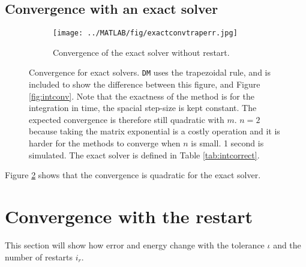 \subsection{Convergence with an exact solver} %
\label{sec:exactconv}
\begin{figure}[H]
        \centering
        \begin{subfigure}[b]{0.3\textwidth}
                \texttt{[image: ../MATLAB/fig/exactconvtraperr.jpg]}
                \caption{ Convergence of the exact solver without restart. }
                \label{fig:exactconvtraperr}
        \end{subfigure}
       
\caption{Convergence for exact solvers. \texttt{DM} uses the trapezoidal rule, and is included to show the difference between this figure, and Figure \ref{fig:intconv}. Note that the exactness of the method is for the integration in time, the spacial step-size is kept constant. The expected convergence is therefore still quadratic with $m$. $n = 2$ because taking the matrix exponential is a costly operation and it is harder for the methods to converge when $n$ is small. 1 second is simulated. The exact solver is defined in Table \ref{tab:intcorrect}. }
\label{fig:intexactt}
\end{figure}
Figure \ref{fig:intexactt} shows that the convergence is quadratic for the exact solver. %

\section{Convergence with the restart}%
\label{sec:crestart}
This section will show how error and energy change with the tolerance $\iota$ and the number of restarts $i_r$.

